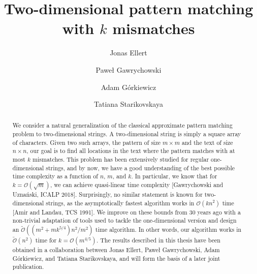 \documentclass[11pt, letterpaper]{article}
\title{Two-dimensional pattern matching with $k$ mismatches}
\author[1]{Jonas Ellert}
\author[2]{Paweł Gawrychowski}
\author[3]{Adam Górkiewicz}
\author[4]{Tatiana Starikovskaya}
\affil[1]{DI/ENS, PSL Research University, France}
\affil[2,3]{Institute of Computer Science, University of Wrocław, Poland}
\affil[4]{DI/ENS, PSL Research University, France}
\theoremstyle{plain}
\theoremstyle{definition}
\theoremstyle{remark}
\renewcommand{\O}{\mathcal{O}}
\newcommand{\tO}{\tilde{\mathcal{O}}}
\begin{document}
\date{}
\maketitle

\begin{abstract}
	We consider a natural generalization of the classical approximate pattern matching problem to two-dimensional strings.
	A two-dimensional string is simply a square array of characters.
	Given two such arrays, the pattern of size $m\times m$ and the text of size $n\times n$, our goal is to find all locations in the text where the pattern matches with at most $k$ mismatches.
	This problem has been extensively studied for regular one-dimensional strings, and by now, we have a good understanding of the best possible time complexity as a function of $n$, $m$, and $k$.
	In particular, we know that for $k=\O(\sqrt{m})$, we can achieve quasi-linear time complexity [Gawrychowski and Uznański, ICALP 2018].
	Surprisingly, no similar statement is known for two-dimensional strings, as the asymptotically fastest algorithm works in $\O(kn^{2})$ time [Amir and Landau, TCS 1991].
	We improve on these bounds from 30 years ago with a non-trivial adaptation of tools used to tackle the one-dimensional version and design an $\tO((m^{2}+mk^{5/4})n^{2}/m^{2})$ time algorithm.
	In other words, our algorithm works in $\tO(n^{2})$ time for $k=\O(m^{4/5})$.
	The results described in this thesis have been obtained in a collaboration between Jonas Ellert, Paweł Gawrychowski, Adam Górkiewicz, and Tatiana Starikovskaya, and will form the basis of a later joint publication.
\end{abstract}
\end{document}
